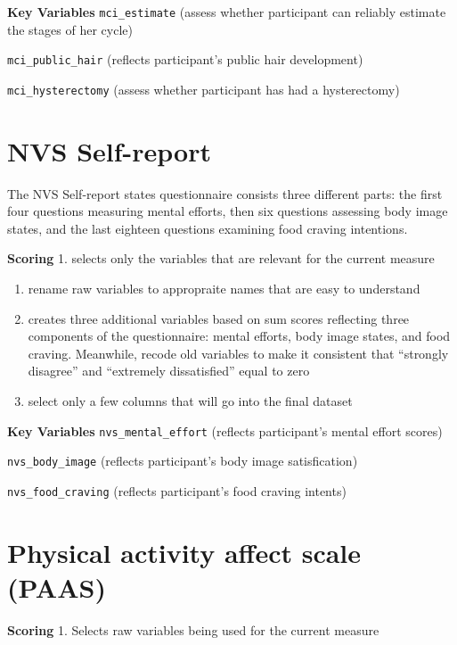 \documentclass[
]{book}
\begin{document}
\textbf{Key Variables} \texttt{mci\_estimate} (assess whether participant can
reliably estimate the stages of her cycle)

\texttt{mci\_public\_hair} (reflects participant's public hair development)

\texttt{mci\_hysterectomy} (assess whether participant has had a hysterectomy)

\section{NVS Self-report}\label{nvs-self-report}

The NVS Self-report states questionnaire consists three different parts:
the first four questions measuring mental efforts, then six questions
assessing body image states, and the last eighteen questions examining
food craving intentions.

\textbf{Scoring} 1. selects only the variables that are relevant for the
current measure

\begin{enumerate}
\def\labelenumi{\arabic{enumi}.}
\setcounter{enumi}{1}
\item
  rename raw variables to appropraite names that are easy to
  understand
\item
  creates three additional variables based on sum scores reflecting
  three components of the questionnaire: mental efforts, body image
  states, and food craving. Meanwhile, recode old variables to make it
  consistent that ``strongly disagree'' and ``extremely dissatisfied''
  equal to zero
\item
  select only a few columns that will go into the final dataset
\end{enumerate}

\textbf{Key Variables} \texttt{nvs\_mental\_effort} (reflects participant's mental
effort scores)

\texttt{nvs\_body\_image} (reflects participant's body image satisfication)

\texttt{nvs\_food\_craving} (reflects participant's food craving intents)

\section{Physical activity affect scale (PAAS)}\label{physical-activity-affect-scale-paas}

\textbf{Scoring} 1. Selects raw variables being used for the current measure
\end{document}
